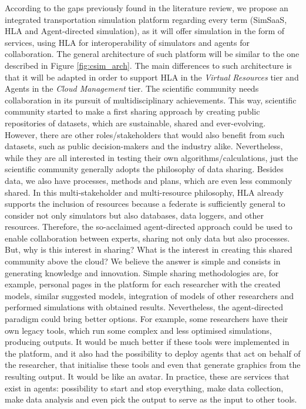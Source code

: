 \documentclass[a0paper,fontscale=0.4125,landscape]{baposter} %
\begin{document}
\begin{poster}
 {According to the gaps previously found in the literature review, we propose an integrated transportation simulation platform regarding every term (SimSaaS, HLA and Agent-directed simulation), as it will offer simulation in the form of services, using HLA for interoperability of simulators and agents for collaboration. The general architecture of such platform will be similar to the one described in Figure \ref{fig:csim_arch}. The main differences to such architecture is that it will be adapted in order to support HLA in the \textit{Virtual Resources} tier and Agents in the \textit{Cloud Management} tier.
The scientific community needs collaboration in its pursuit of multidisciplinary achievements. This way, scientific community started to make a first sharing approach by creating public repositories of datasets, which are sustainable, shared and ever-evolving. However, there are other roles/stakeholders that would also benefit from such datasets, such as public decision-makers and the industry alike. Nevertheless, while they are all interested in testing their own algorithms/calculations, just the scientific community generally adopts the philosophy of data sharing. Besides data, we also have processes, methods and plans, which are even less commonly shared.
In this multi-stakeholder and multi-resource philosophy, HLA already supports the inclusion of resources because a federate is sufficiently general to consider not only simulators but also databases, data loggers, and other resources. Therefore, the so-acclaimed agent-directed approach could be used to enable collaboration between experts, sharing not only data but also processes. But, why is this interest in sharing? What is the interest in creating this shared community above the cloud? We believe the answer is simple and consists in generating knowledge and innovation.
Simple sharing methodologies are, for example, personal pages in the platform for each researcher with the created models, similar suggested models, integration of models of other researchers and performed simulations with obtained results. Nevertheless, the agent-directed paradigm could bring better options. For example, some researchers have their own legacy tools, which run some complex and less optimised simulations, producing outputs. It would be much better if these tools were implemented in the platform, and it also had the possibility to deploy agents that act on behalf of the researcher, that initialise these tools and even that generate graphics from the resulting output. It would be like an avatar. In practice, these are services that exist in agents: possibility to start and stop everything, make data collection, make data analysis and even pick the output to serve as the input to other tools.
}
\end{poster}
\end{document}
